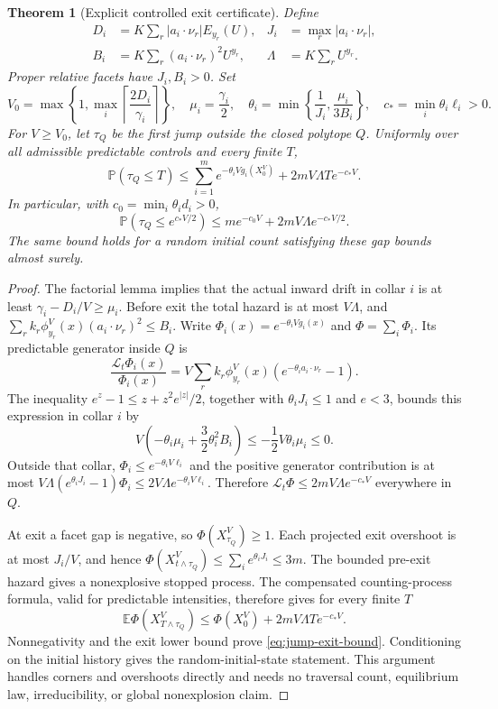 \documentclass[11pt]{article}
\newtheorem{theorem}{Theorem}[section]
\theoremstyle{definition}
\theoremstyle{remark}
\numberwithin{equation}{section}
\begin{document}
\begin{theorem}[Explicit controlled exit certificate]
Define
\[
\begin{aligned}
 D_i&=K\sum_r|a_i\cdot\nu_r|E_{y_r}(U),&
 J_i&=\max_r|a_i\cdot\nu_r|,\\
 B_i&=K\sum_r(a_i\cdot\nu_r)^2U^{y_r},&
 \Lambda&=K\sum_r U^{y_r}.
\end{aligned}
\]
Proper relative facets have $J_i,B_i>0$. Set
\[
 V_0=\max\left\{1,\max_i\left\lceil\frac{2D_i}{\gamma_i}
                         \right\rceil\right\},\quad
 \mu_i=\frac{\gamma_i}{2},\quad
 \theta_i=\min\left\{\frac1{J_i},\frac{\mu_i}{3B_i}\right\},
 \quad c_* =\min_i\theta_i\ell_i>0.
\]
For $V\ge V_0$, let $\tau_Q$ be the first jump outside the closed
polytope $Q$. Uniformly over all admissible predictable controls and
every finite $T$,
\begin{equation}
 \mathbb P(\tau_Q\le T)
 \le\sum_{i=1}^m e^{-\theta_i Vg_i(X^V_0)}
                 +2mV\Lambda T e^{-c_*V}.
 \label{eq:jump-exit-bound}
\end{equation}
In particular, with $c_0=\min_i\theta_i d_i>0$,
\[
 \mathbb P(\tau_Q\le e^{c_*V/2})
       \le m e^{-c_0V}+2mV\Lambda e^{-c_*V/2}.
\]
The same bound holds for a random initial count satisfying these gap
bounds almost surely.
\end{theorem}
\begin{proof}
The factorial lemma implies that the actual inward drift in collar $i$
is at least $\gamma_i-D_i/V\ge\mu_i$. Before exit the total hazard is
at most $V\Lambda$, and
$\sum_r k_r\phi^V_{y_r}(x)(a_i\cdot\nu_r)^2\le B_i$.
Write $\Phi_i(x)=e^{-\theta_i Vg_i(x)}$ and
$\Phi=\sum_i\Phi_i$. Its predictable generator inside $Q$ is
\[
 \frac{\mathcal L_t\Phi_i(x)}{\Phi_i(x)}
  =V\sum_r k_r\phi^V_{y_r}(x)
                        (e^{-\theta_i a_i\cdot\nu_r}-1).
\]
The inequality $e^z-1\le z+z^2 e^{|z|}/2$, together with
$\theta_iJ_i\le1$ and $e<3$, bounds this expression in collar $i$ by
\[
 V\left(-\theta_i\mu_i+\frac32\theta_i^2B_i\right)
          \le-\frac12V\theta_i\mu_i\le0.
\]
Outside that collar, $\Phi_i\le e^{-\theta_i V\ell_i}$ and the
positive generator contribution is at most
$V\Lambda(e^{\theta_iJ_i}-1)\Phi_i
 \le2V\Lambda e^{-\theta_i V\ell_i}$.
Therefore $\mathcal L_t\Phi\le2mV\Lambda e^{-c_*V}$ everywhere in $Q$.

At exit a facet gap is negative, so $\Phi(X^V_{\tau_Q})\ge1$.
Each projected exit overshoot is at most $J_i/V$, and hence
$\Phi(X^V_{t\wedge\tau_Q})\le\sum_i e^{\theta_iJ_i}\le3m$.
The bounded pre-exit hazard gives a nonexplosive stopped process.
The compensated counting-process formula, valid for predictable
intensities, therefore gives for every finite $T$
\[
 \mathbb E\Phi(X^V_{T\wedge\tau_Q})
 \le\Phi(X^V_0)+2mV\Lambda T e^{-c_*V}.
\]
Nonnegativity and the exit lower bound prove
\eqref{eq:jump-exit-bound}. Conditioning on the initial history gives
the random-initial-state statement. This argument handles corners and
overshoots directly and needs no traversal count, equilibrium law,
irreducibility, or global nonexplosion claim.
\end{proof}
\end{document}
